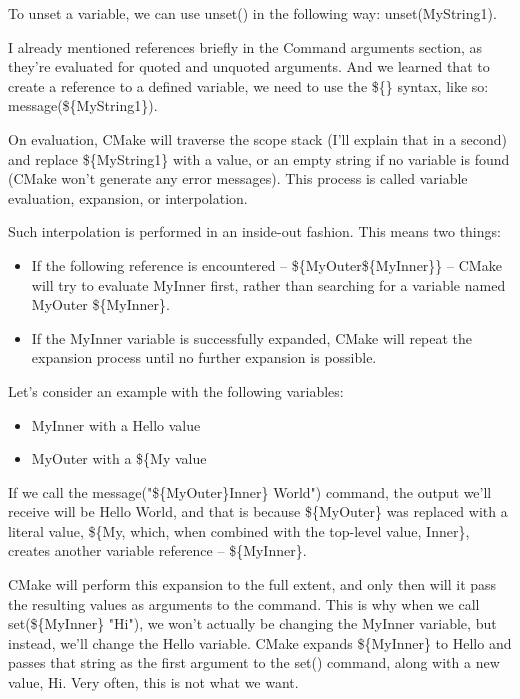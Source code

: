 To unset a variable, we can use unset() in the following way: unset(MyString1).


I already mentioned references briefly in the Command arguments section, as they're evaluated for quoted and unquoted arguments. And we learned that to create a reference to a defined variable, we need to use the \$\{\} syntax, like so: message(\$\{MyString1\}).

On evaluation, CMake will traverse the scope stack (I'll explain that in a second) and replace \$\{MyString1\} with a value, or an empty string if no variable is found (CMake won't generate any error messages). This process is called variable evaluation, expansion, or interpolation.

Such interpolation is performed in an inside-out fashion. This means two things:

\begin{itemize}
\item 
If the following reference is encountered – \$\{MyOuter\$\{MyInner\}\} – CMake will try to evaluate MyInner first, rather than searching for a variable named MyOuter \$\{MyInner\}.

\item 
If the MyInner variable is successfully expanded, CMake will repeat the expansion process until no further expansion is possible.
\end{itemize}

Let's consider an example with the following variables:

\begin{itemize}
\item 
MyInner with a Hello value

\item 
MyOuter with a \$\{My value
\end{itemize}

If we call the message("\$\{MyOuter\}Inner\} World") command, the output we'll receive will be Hello World, and that is because \$\{MyOuter\} was replaced with a literal value, \$\{My, which, when combined with the top-level value, Inner\}, creates another variable reference – \$\{MyInner\}.

CMake will perform this expansion to the full extent, and only then will it pass the resulting values as arguments to the command. This is why when we call set(\$\{MyInner\} "Hi"), we won't actually be changing the MyInner variable, but instead, we'll change the Hello variable. CMake expands \$\{MyInner\} to Hello and passes that string as the first argument to the set() command, along with a new value, Hi. Very often, this is not what we want.

